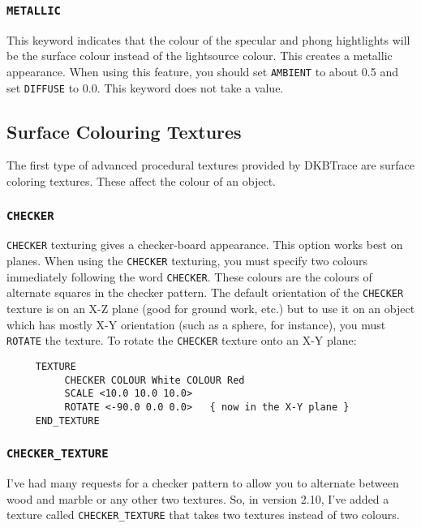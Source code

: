 \subsubsection{{\tt METALLIC}}

This keyword indicates that the colour of the specular and phong
hightlights will be the surface colour instead of the lightsource
colour.  This creates a metallic appearance.  When using this feature,
you should set {\tt AMBIENT} to about 0.5 and set {\tt DIFFUSE} to
0.0. This keyword does not take a value.

\subsection{Surface Colouring Textures}

The first type of advanced procedural textures provided by DKBTrace
are surface coloring textures. These affect the colour of an object.

\subsubsection{{\tt CHECKER}}

{\tt CHECKER} texturing gives a checker-board appearance.  This option
works best on planes.  When using the {\tt CHECKER} texturing, you
must specify two colours immediately following the word {\tt CHECKER}.
These colours are the colours of alternate squares in the checker
pattern.  The default orientation of the {\tt CHECKER} texture is on
an X-Z plane (good for ground work, etc.) but to use it on an object
which has mostly X-Y orientation (such as a sphere, for instance), you
must {\tt ROTATE} the texture. To rotate the {\tt CHECKER} texture
onto an X-Y plane:
\begin{verbatim}
     TEXTURE
          CHECKER COLOUR White COLOUR Red
          SCALE <10.0 10.0 10.0>
          ROTATE <-90.0 0.0 0.0>   { now in the X-Y plane }
     END_TEXTURE
\end{verbatim}

\subsubsection{{\tt CHECKER_TEXTURE}}

I've had many requests for a checker pattern to allow you to alternate
between wood and marble or any other two textures.  So, in version
2.10, I've added a texture called {\tt CHECKER_TEXTURE} that takes
two textures instead of two colours.

